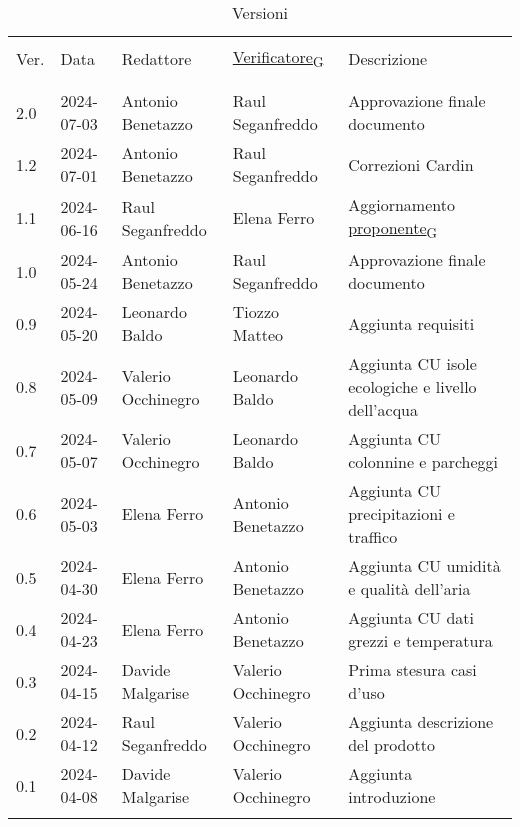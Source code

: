 \documentclass[12pt]{article}
\begin{document}


\newpage



\captionsetup[table]{list=no}
\begin{table}[!h]
	\footnotesize
	\begin{center}
		\caption*{Versioni}
		\vspace{0.5cm}
		\begin{tabular}{ l l l l p{6.1cm} }
			\hline                                                                                                          \\[-2ex]
			Ver. & Data & Redattore & \href{https://7last.github.io/docs/pb/documentazione-interna/glossario\#verificatore}{Verificatore\textsubscript{G}} & Descrizione\\
			\\[-2ex] \hline \\[-1.5ex]
			2.0 & 2024-07-03 & Antonio Benetazzo  & Raul Seganfreddo   & Approvazione finale documento\\
			1.2 & 2024-07-01 & Antonio Benetazzo  & Raul Seganfreddo   & Correzioni Cardin\\
			1.1 & 2024-06-16 & Raul Seganfreddo   & Elena Ferro        & Aggiornamento \href{https://7last.github.io/docs/pb/documentazione-interna/glossario\#proponente}{proponente\textsubscript{G}}\\
			1.0 & 2024-05-24 & Antonio Benetazzo  & Raul Seganfreddo   & Approvazione finale documento\\
			0.9 & 2024-05-20 & Leonardo Baldo     & Tiozzo Matteo      & Aggiunta requisiti\\
			0.8 & 2024-05-09 & Valerio Occhinegro & Leonardo Baldo     & Aggiunta CU isole ecologiche e livello dell'acqua \\
			0.7 & 2024-05-07 & Valerio Occhinegro & Leonardo Baldo     & Aggiunta CU colonnine e parcheggi\\
			0.6 & 2024-05-03 & Elena Ferro        & Antonio Benetazzo  & Aggiunta CU precipitazioni e traffico\\
			0.5 & 2024-04-30 & Elena Ferro        & Antonio Benetazzo  & Aggiunta CU umidità e qualità dell'aria\\
			0.4 & 2024-04-23 & Elena Ferro        & Antonio Benetazzo  & Aggiunta CU dati grezzi e temperatura\\
			0.3 & 2024-04-15 & Davide Malgarise   & Valerio Occhinegro & Prima stesura casi d'uso\\
			0.2 & 2024-04-12 & Raul Seganfreddo   & Valerio Occhinegro & Aggiunta descrizione del prodotto \\
			0.1 & 2024-04-08 & Davide Malgarise   & Valerio Occhinegro & Aggiunta introduzione \\
			\\[-1.5ex] \hline
		\end{tabular}
	\end{center}
\end{table}
\captionsetup[table]{list=yes}

\newpage

\tableofcontents
\listoftables
\listoffigures

\newpage



\newpage



\newpage



\newpage


\end{document}
